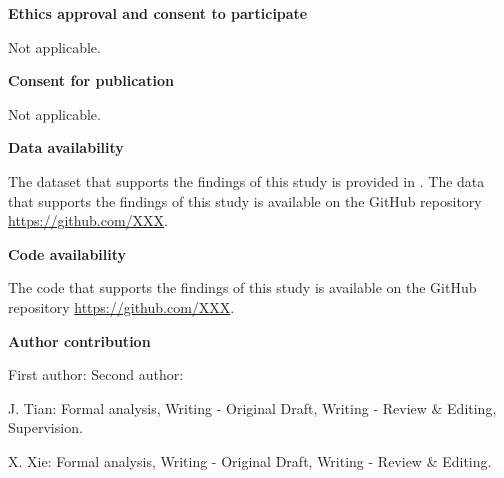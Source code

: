 \documentclass[lineno,pdflatex,sn-mathphys-num]{sn-jnl}%
\theoremstyle{thmstyleone}%
\theoremstyle{thmstyletwo}%
\theoremstyle{thmstylethree}%
\begin{document}
\noindent\textbf{Ethics approval and consent to participate}

Not applicable.\newline

\noindent\textbf{Consent for publication}

Not applicable.\newline

\noindent\textbf{Data availability }

The dataset that supports the findings of this study is provided in \cite{Barz21WikiChurches}. The data that supports the findings of this study is available on the GitHub repository \url{https://github.com/XXX}.\newline

\noindent\textbf{Code availability }

The code that supports the findings of this study is available on the GitHub repository \url{https://github.com/XXX}.\newline

\noindent\textbf{Author contribution}


First author: Second author:

J. Tian: Formal analysis, Writing - Original Draft, Writing - Review \& Editing, Supervision.

X. Xie: Formal analysis, Writing - Original Draft, Writing - Review \& Editing.



\end{document}
